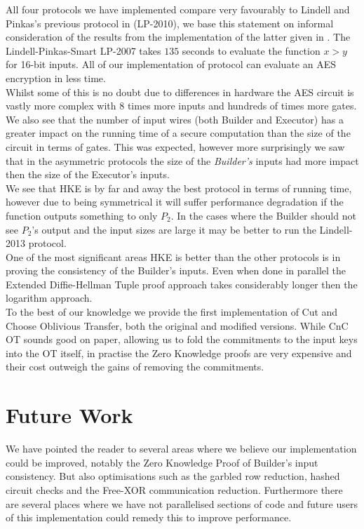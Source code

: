 \documentclass[ %
                    author={Nicholas Tutte},
                supervisor={Prof. Nigel Smart},
                    degree={MEng},
                     title={Secure Two Party Computation},
                  subtitle={A practical comparison of recent protocols},
                      type={Research - GG1K},
                      year={2015} ]{dissertation}
\begin{document}
		All four protocols we have implemented compare very favourably to Lindell and Pinkas's previous protocol in \cite{LindellAndPinkas2007} (LP-2010), we base this statement on informal consideration of the results from the implementation of the latter given in \cite{LindellPinkasSmart2008}. The Lindell-Pinkas-Smart LP-2007 takes $135$ seconds to evaluate the function $x > y$ for 16-bit inputs. All of our implementation of protocol can evaluate an AES encryption in less time.\\

		Whilst some of this is no doubt due to differences in hardware the AES circuit is vastly more complex with 8 times more inputs and hundreds of times more gates.\\

		We also see that the number of input wires (both Builder and Executor) has a greater impact on the running time of a secure computation than the size of the circuit in terms of gates. This was expected, however more surprisingly we saw that in the asymmetric protocols the size of the \emph{Builder's} inputs had more impact then the size of the Executor's inputs.\\

		We see that HKE is by far and away the best protocol in terms of running time, however due to being symmetrical it will suffer performance degradation if the function outputs something to only $P_2$. In the cases where the Builder should not see $P_2$'s output and the input sizes are large it may be better to run the Lindell-2013 protocol.\\

		One of the most significant areas HKE is better than the other protocols is in proving the consistency of the Builder's inputs. Even when done in parallel the Extended Diffie-Hellman Tuple proof approach takes considerably longer then the logarithm approach.\\

		To the best of our knowledge we provide the first implementation of Cut and Choose Oblivious Transfer, both the original and modified versions. While CnC OT sounds good on paper, allowing us to fold the commitments to the input keys into the OT itself, in practise the Zero Knowledge proofs are very expensive and their cost outweigh the gains of removing the commitments.

		\section{Future Work}
			We have pointed the reader to several areas where we believe our implementation could be improved, notably the Zero Knowledge Proof of Builder's input consistency. But also optimisations such as the garbled row reduction, hashed circuit checks and the Free-XOR communication reduction. Furthermore there are several places where we have not parallelised sections of code and future users of this implementation could remedy this to improve performance.\\
\end{document}
